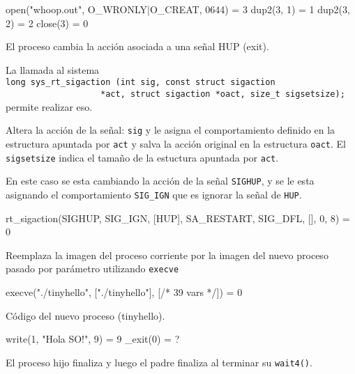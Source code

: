 \begin{framed}
\begin{verbatimtab}
open("whoop.out", O_WRONLY|O_CREAT, 0644) = 3
dup2(3, 1)                  = 1
dup2(3, 2)                  = 2
close(3)                    = 0
\end{verbatimtab}
\end{framed}

El proceso cambia la acci\'on asociada a una se\~nal HUP (exit).

La llamada al sistema\\
 \verb|long sys_rt_sigaction (int sig, const struct sigaction |\\
 \verb|                   *act, struct sigaction *oact, size_t sigsetsize);| \\
permite realizar eso.

Altera la acci\'on de la se\~nal: \verb|sig| y le asigna el comportamiento definido en la estructura apuntada por \verb|act| y salva la acci\'on original en la estructura \verb|oact|.
El \verb|sigsetsize| indica el tama\~no de la estuctura apuntada por \verb|act|.

En este caso se esta cambiando la acci\'on de la se\~nal \verb|SIGHUP|, y se le esta asignando el comportamiento \verb|SIG_IGN| que es ignorar la se\~nal de \verb|HUP|.

\begin{framed}
\begin{verbatimtab}
rt_sigaction(SIGHUP, {SIG_IGN, [HUP], SA_RESTART}, {SIG_DFL, [], 0}, 8) = 0
\end{verbatimtab}
\end{framed}

Reemplaza la imagen del proceso corriente por la imagen del nuevo proceso pasado por par\'ametro utilizando \verb|execve|
\begin{framed}
\begin{verbatimtab}
execve("./tinyhello", ["./tinyhello"], [/* 39 vars */]) = 0
\end{verbatimtab}
\end{framed}

C\'odigo del nuevo proceso (tinyhello).
\begin{framed}
\begin{verbatimtab}
write(1, "Hola SO!\n", 9)   = 9
_exit(0)                    = ?
\end{verbatimtab}
\end{framed}

El proceso hijo finaliza y luego el padre finaliza al terminar su \verb|wait4()|. 	

